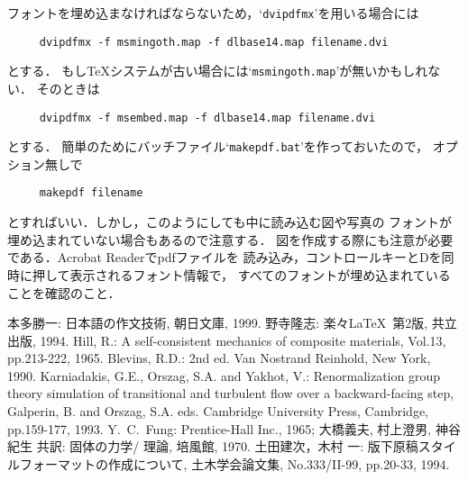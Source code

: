 \documentclass[onecolumn]{jsce}  %
\begin{document}
フォントを埋め込まなければならないため，`{\tt dvipdfmx}'を用いる場合には
\begin{verbatim}
     dvipdfmx -f msmingoth.map -f dlbase14.map filename.dvi
\end{verbatim}
とする．
もし\TeX システムが古い場合には`{\tt msmingoth.map}'が無いかもしれない．
そのときは
\begin{verbatim}
     dvipdfmx -f msembed.map -f dlbase14.map filename.dvi
\end{verbatim}
とする．
簡単のためにバッチファイル`{\tt makepdf.bat}'を作っておいたので，
オプション無しで
\begin{verbatim}
     makepdf filename
\end{verbatim}
とすればいい．しかし，このようにしても中に読み込む図や写真の
フォントが埋め込まれていない場合もあるので注意する．
図を作成する際にも注意が必要である．Acrobat Readerでpdfファイルを
読み込み，コントロールキーとDを同時に押して表示されるフォント情報で，
すべてのフォントが埋め込まれていることを確認のこと．



\begin{thebibliography}{1}
 本多勝一:
 \newblock 日本語の作文技術,
 \newblock 朝日文庫, 1999.
 野寺隆志:
 \newblock 楽々\LaTeX\ 第2版,
 \newblock 共立出版, 1994.
 Hill, R.: A self-consistent mechanics of composite materials,
  Vol.13, pp.213-222, 1965.
 Blevins, R.D.:
  2nd ed.
 Van Nostrand Reinhold, New York, 1990.
 Karniadakis, G.E., Orszag, S.A. and Yakhot, V.:
 Renormalization group theory simulation of
 transitional and turbulent flow over a backward-facing step,
  Galperin, B. and Orszag, S.A. eds.
 Cambridge University Press, Cambridge, pp.159-177, 1993.
 Y.~C.~Fung:
 \newblock Prentice-Hall Inc., 1965;
 \newblock 大橋義夫, 村上澄男, 神谷紀生 共訳:
 \newblock 固体の力学/ 理論, 
 \newblock 培風館, 1970.
 土田建次，木村 一:
 \newblock 版下原稿スタイルフォーマットの作成について,
 \newblock 土木学会論文集, No.333/II-99, pp.20-33, 1994.
\end{thebibliography}

\lastpagesettings
\end{document}
